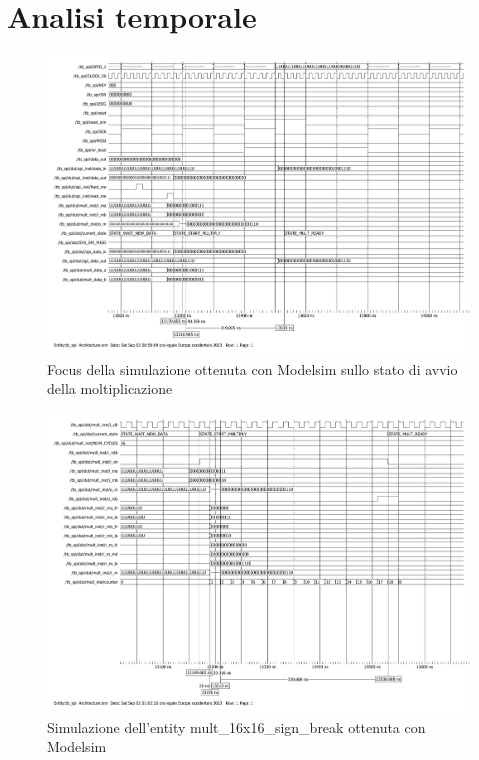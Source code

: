 \documentclass[titlepage]{report}
\begin{document}
	\section*{Analisi temporale}
	\label{sec:Analisi_Temporale}
		\begin{figure}[H]
			\centering
			\includegraphics[scale=0.5]{./img/sim_zoom_mult.pdf}
			\caption{Focus della simulazione ottenuta con Modelsim sullo stato di avvio della moltiplicazione}
			\label{fig:modelsim_sim_completa1}
		\end{figure}

		\begin{figure}[H]
			\centering
			\includegraphics[scale=0.5]{./img/sim_zoom_mult_inside.pdf}
			\caption{Simulazione dell'entity mult\_16x16\_sign\_break ottenuta con Modelsim}
			\label{fig:modelsim_sim_completa2}
		\end{figure}
\end{document}
